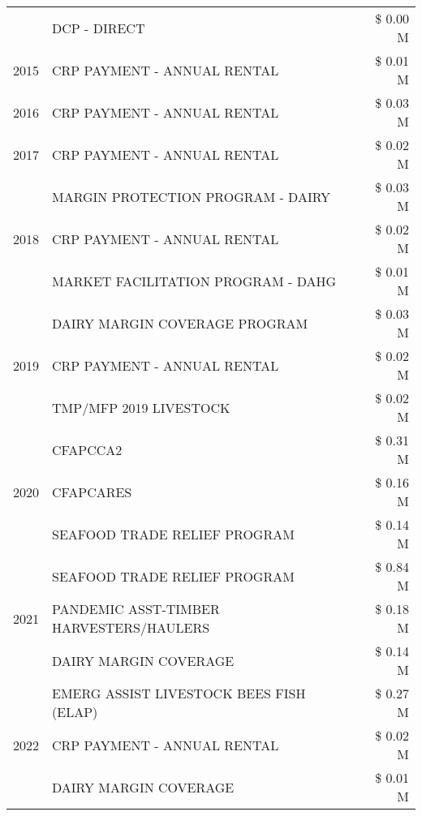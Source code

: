 \begin{tabular}{llr}
 & DCP - DIRECT & \$ 0.00 M \\
\cline{1-3}
2015 & CRP PAYMENT - ANNUAL RENTAL & \$ 0.01 M \\
\cline{1-3}
2016 & CRP PAYMENT - ANNUAL RENTAL & \$ 0.03 M \\
\cline{1-3}
2017 & CRP PAYMENT - ANNUAL RENTAL & \$ 0.02 M \\
\cline{1-3}
\multirow[t]{3}{*}{2018} & MARGIN PROTECTION PROGRAM - DAIRY & \$ 0.03 M \\
 & CRP PAYMENT - ANNUAL RENTAL & \$ 0.02 M \\
 & MARKET FACILITATION PROGRAM - DAHG & \$ 0.01 M \\
\cline{1-3}
\multirow[t]{3}{*}{2019} & DAIRY MARGIN COVERAGE PROGRAM & \$ 0.03 M \\
 & CRP PAYMENT - ANNUAL RENTAL & \$ 0.02 M \\
 & TMP/MFP 2019 LIVESTOCK & \$ 0.02 M \\
\cline{1-3}
\multirow[t]{3}{*}{2020} & CFAPCCA2 & \$ 0.31 M \\
 & CFAPCARES & \$ 0.16 M \\
 & SEAFOOD TRADE RELIEF PROGRAM & \$ 0.14 M \\
\cline{1-3}
\multirow[t]{3}{*}{2021} & SEAFOOD TRADE RELIEF PROGRAM & \$ 0.84 M \\
 & PANDEMIC ASST-TIMBER HARVESTERS/HAULERS & \$ 0.18 M \\
 & DAIRY MARGIN COVERAGE & \$ 0.14 M \\
\cline{1-3}
\multirow[t]{3}{*}{2022} & EMERG ASSIST LIVESTOCK BEES FISH (ELAP) & \$ 0.27 M \\
 & CRP PAYMENT - ANNUAL RENTAL & \$ 0.02 M \\
 & DAIRY MARGIN COVERAGE & \$ 0.01 M \\
\cline{1-3}
\bottomrule
\end{tabular}
